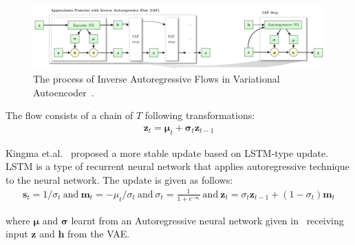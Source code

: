 \documentclass[runningheads]{llncs}
\begin{document}
\begin{figure}[htb]
	\centering
	\includegraphics[width=\textwidth]{imgs/iaf}
	\caption{The process of Inverse Autoregressive Flows in Variational Autoencoder~\cite{kingma2016improved}.}
	\label{fig:iaf}
\end{figure}

The flow consists of a chain of $T$ following transformations:
\begin{align}
\mathbf{z}_t = \bm{\mu}_t + \bm{\sigma}_t\mathbf{z}_{t-1}
\end{align}

Kingma et.al.~\cite{kingma2016improved} proposed a more stable update based on LSTM-type update. LSTM is a type of recurrent neural network that applies autoregressive technique to the neural network.  The update is given as follows:
\begin{align}
\mathbf{s}_t = 1 / \sigma_t\:\text{and}\:\mathbf{m}_t = -\mu_t / \sigma_t\:\text{and}\:\sigma_t = \frac{1}{1 + e^{-\mathbf{s}_t}}\:\text{and}\:\mathbf{z}_t = \sigma_t\mathbf{z}_{t-1} + (1 - \sigma_t)\mathbf{m}_{t} 
\end{align}

where $\bm{\mu}$ and $\bm{\sigma}$ learnt from an Autoregressive neural network given in~\cite{germain2015made} receiving input $\mathbf{z}$ and $\mathbf{h}$ from the VAE. 
\end{document}
